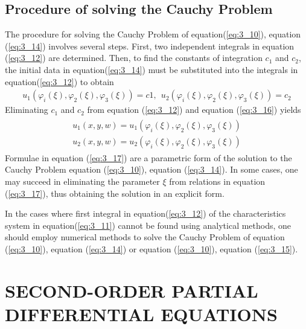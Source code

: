 \documentclass[11pt]{report}
\newcommand{\refn}[1]{(\ref{#1})}
\newcommand{\refx}[1]{\refn{eq:#1}}
\begin{document}
	\subsection{Procedure of solving the Cauchy Problem}
	The procedure for solving the Cauchy Problem of equation\refx{3_10}, equation \refx{3_14} involves several steps. First, two independent integrals in equation \refx{3_12} are determined. Then, to find the constants of integration $c_1$ and $c_2$, the initial data in equation\refx{3_14} must be substituted into the integrals in equation\refx{3_12} to obtain
	\begin{eqnarray}
		u_1(\varphi_i(\xi), \varphi_2(\xi), \varphi_3(\xi)) = c1,~~ u_2(\varphi_i(\xi), \varphi_2(\xi), \varphi_3(\xi))=c_2\label{eq:3_16}
	\end{eqnarray}
	Eliminating $c_1$ and $c_2$ from equation \refx{3_12} and equation \refx{3_16} yields
	\begin{eqnarray}
		\begin{split}
			u_1(x,y,w)=u_1(\varphi_i(\xi), \varphi_2(\xi), \varphi_3(\xi))\\
			u_2(x,y,w) = u_2(\varphi_i(\xi), \varphi_2(\xi), \varphi_3(\xi))
		\end{split}\label{eq:3_17}
	\end{eqnarray}
	Formulae in equation \refx{3_17} are a parametric form of the solution to the Cauchy Problem equation \refx{3_10}, equation \refx{3_14}. In some cases, one may succeed in eliminating the parameter $\xi$ from relations in equation \refx{3_17}, thus obtaining the solution in an explicit form.
	
	In the cases where first integral in equation\refx{3_12} of the characteristics system in equation\refx{3_11} cannot be found using analytical methods, one should employ numerical methods to solve the Cauchy Problem of equation \refx{3_10}, equation \refx{3_14} or equation \refx{3_10}, equation \refx{3_15}.
	
	\section{SECOND-ORDER PARTIAL DIFFERENTIAL EQUATIONS}
\end{document}
